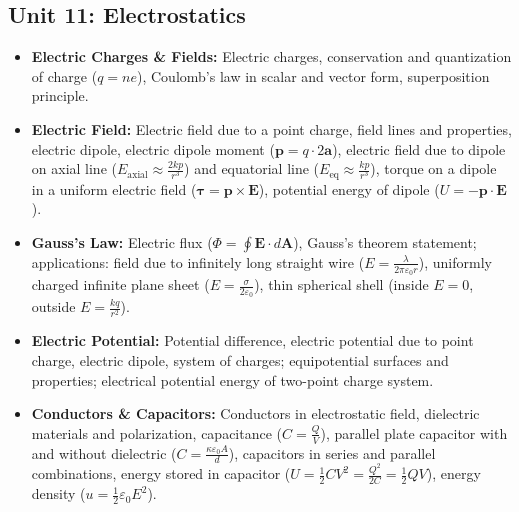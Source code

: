 \documentclass[11pt,a4paper]{article}
\begin{document}
\subsection{Unit 11: Electrostatics}
\begin{itemize}
  \item \textbf{Electric Charges \& Fields:} Electric charges, conservation and quantization of charge ($q = ne$), Coulomb's law in scalar and vector form, superposition principle.
  \item \textbf{Electric Field:} Electric field due to a point charge, field lines and properties, electric dipole, electric dipole moment ($\mathbf{p} = q\cdot 2\mathbf{a}$), electric field due to dipole on axial line ($E_{\text{axial}} \approx \frac{2kp}{r^3}$) and equatorial line ($E_{\text{eq}} \approx \frac{kp}{r^3}$), torque on a dipole in a uniform electric field ($\boldsymbol{\tau} = \mathbf{p}\times\mathbf{E}$), potential energy of dipole ($U = -\mathbf{p}\cdot\mathbf{E}$).
  \item \textbf{Gauss's Law:} Electric flux ($\Phi = \oint \mathbf{E}\cdot d\mathbf{A}$), Gauss's theorem statement; applications: field due to infinitely long straight wire ($E = \frac{\lambda}{2\pi\varepsilon_0 r}$), uniformly charged infinite plane sheet ($E = \frac{\sigma}{2\varepsilon_0}$), thin spherical shell (inside $E=0$, outside $E = \frac{kq}{r^2}$).
  \item \textbf{Electric Potential:} Potential difference, electric potential due to point charge, electric dipole, system of charges; equipotential surfaces and properties; electrical potential energy of two-point charge system.
  \item \textbf{Conductors \& Capacitors:} Conductors in electrostatic field, dielectric materials and polarization, capacitance ($C = \frac{Q}{V}$), parallel plate capacitor with and without dielectric ($C = \frac{\kappa \varepsilon_0 A}{d}$), capacitors in series and parallel combinations, energy stored in capacitor ($U = \frac{1}{2}CV^2 = \frac{Q^2}{2C} = \frac{1}{2}QV$), energy density ($u = \frac{1}{2}\varepsilon_0 E^2$).
\end{itemize}
\end{document}
